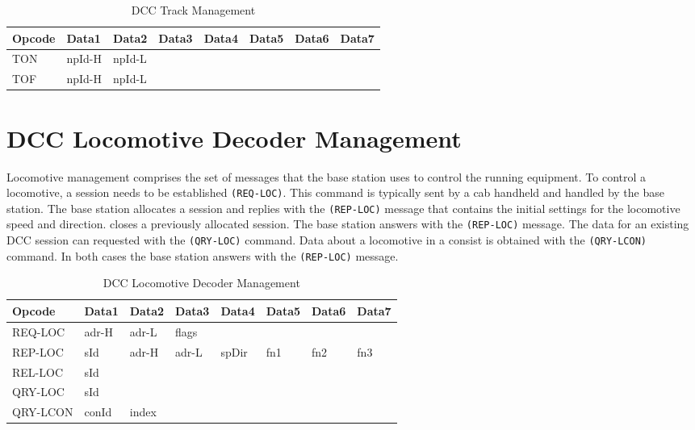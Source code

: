 \begin{table}[ht!]
    \begin{center}
        \caption{DCC Track Management}
        \begin{tabular}{|l|l|l|l|l|l|l|l|}
            \toprule
            \textbf{Opcode} & \textbf{Data1} & \textbf{Data2} & \textbf{Data3} & \textbf{Data4} & \textbf{Data5} & \textbf{Data6} & \textbf{Data7} \\
            \midrule
            TON & npId-H & npId-L & & & & & \\
            TOF & npId-H & npId-L & & & & & \\
            \bottomrule
        \end{tabular}
    \end{center}
\end{table}

\section{DCC Locomotive Decoder Management}

Locomotive management comprises the set of messages that the base station uses to control the running equipment. To control a locomotive, a session needs to be established \texttt{(REQ-LOC)}. This command is typically sent by a cab handheld and handled by the base station. The base station allocates a session and replies with the \texttt{(REP-LOC)} message that contains the initial settings for the locomotive speed and direction.  closes a previously allocated session. The base station answers with the \texttt{(REP-LOC)} message. The data for an existing DCC session can requested with the \texttt{(QRY-LOC)} command. Data about a locomotive in a consist is obtained with the \texttt{(QRY-LCON)} command. In both cases the base station answers with the \texttt{(REP-LOC)} message.

\begin{table}[ht!]
    \begin{center}
        \caption{DCC Locomotive Decoder Management}
        \begin{tabular}{|l|l|l|l|l|l|l|l|}
            \toprule
            \textbf{Opcode} & \textbf{Data1} & \textbf{Data2} & \textbf{Data3} & \textbf{Data4} & \textbf{Data5} & \textbf{Data6} & \textbf{Data7} \\
            \midrule
            REQ-LOC & adr-H & adr-L & flags & & & & \\
            REP-LOC & sId & adr-H & adr-L & spDir & fn1 & fn2 & fn3 \\
            REL-LOC & sId & & & & & & \\
            QRY-LOC & sId & & & & & & \\
            QRY-LCON & conId & index & & & & & \\
            \bottomrule
        \end{tabular}
    \end{center}
\end{table}


